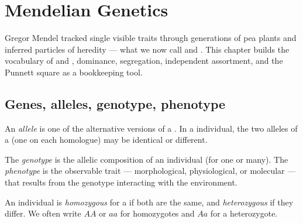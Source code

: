 \chapter{Mendelian Genetics}\label{ch:g11:mendelian-genetics}

Gregor Mendel tracked single visible traits through generations of pea plants and
inferred particles of heredity --- what we now call  and . This
chapter builds the vocabulary of  and , dominance, segregation,
independent assortment, and the Punnett square as a bookkeeping tool.

\section{Genes, alleles, genotype, phenotype}

\begin{definition}[Allele]\label{def:g11:mendelian-genetics:allele}
An \emph{allele} is one of the alternative versions of a . In
a  individual, the two alleles of a  (one on each homologue) may be
identical or different.
\end{definition}

\begin{definition}\label{def:g11:mendelian-genetics:geno-pheno}
The \emph{genotype} is the allelic composition of an individual
(for one  or many). The \emph{phenotype} is the observable
trait --- morphological, physiological, or molecular --- that results from the
genotype interacting with the environment.
\end{definition}

\begin{definition}\label{def:g11:mendelian-genetics:zygous}
An individual is \emph{homozygous} for a  if both 
are the same, and \emph{heterozygous} if they differ. We
often write $AA$ or $aa$ for homozygotes and $Aa$ for a heterozygote.
\end{definition}

